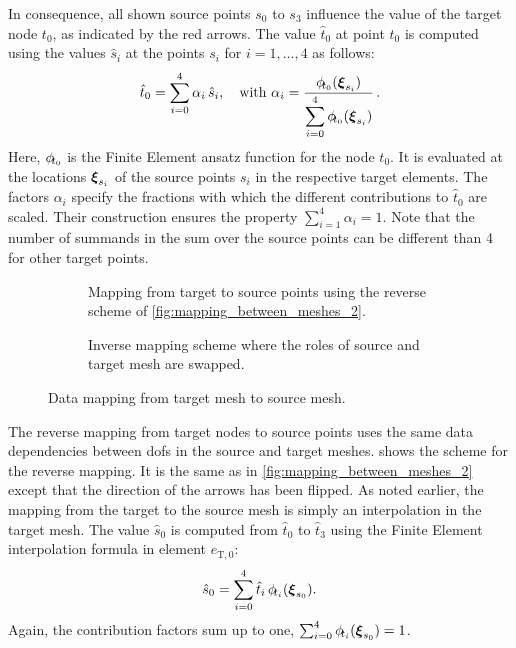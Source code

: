 In consequence, all shown source points $s_0$ to $s_3$ influence the value of the target node $t_0$, as indicated by the red arrows.
The value $\hat{t}_0$ at point $t_0$ is computed using the values $\hat{s}_i$ at the points $s_i$ for $i=1,\dots,4$ as follows:
%
\begin{align}\label{eq:mapping_source_target}
  \hat{t}_0 = \s{i=0}{4} \alpha_i\,\hat{s}_i, \quad \text{with }\alpha_i = \dfrac{\phi_{\noexpand\mkern-4mu t_0}(\bfxi_{s_i})}{\s{i=0}{4} \phi_{\noexpand\mkern-4mu t_0}(\bfxi_{s_i})}.
\end{align}
Here, $\phi_{\noexpand\mkern-4mu t_0}$ is the Finite Element ansatz function for the node $t_0$. It is evaluated at the locations $\boldsymbol{\xi}_{s_i}$ of the source points $s_i$ in the respective target elements. The factors $\alpha_i$ specify the fractions with which the different contributions to $\hat{t}_0$ are scaled. Their construction ensures the property $\sum_{i=1}^4 \alpha_i = 1$.
Note that the number of summands in the sum over the source points can be different than 4 for other target points.

\begin{figure}%
  \centering%
  \begin{subfigure}{0.4\textwidth}
    \centering
    \def\svgwidth{\textwidth}
    \caption{Mapping from target to source points using the reverse scheme of \cref{fig:mapping_between_meshes_2}.}%
    \label{fig:mapping_between_meshes_3}%
  \end{subfigure}
  \quad
  \begin{subfigure}{0.4\textwidth}
    \centering
    \def\svgwidth{\textwidth}
    \caption{Inverse mapping scheme where the roles of source and target mesh are swapped.}%
    \label{fig:mapping_between_meshes_4}%
  \end{subfigure}
  \caption{Data mapping from target mesh to source mesh.}%
  \label{fig:mapping_between_meshes_34}%
\end{figure}%

The reverse mapping from target nodes to source points uses the same data dependencies between dofs in the source and target meshes.  shows the scheme for the reverse mapping. It is the same as in \cref{fig:mapping_between_meshes_2} except that the direction of the arrows has been flipped. As noted earlier, the mapping from the target to the source mesh is simply an interpolation in the target mesh. The value $\hat{s}_0$ is computed from $\hat{t}_0$ to $\hat{t}_3$ using the Finite Element interpolation formula in element $e_{\text{T},0}$:%
\begin{align*}
  \hat{s}_0 = \s{i=0}{4}\hat{t}_i\,\phi_{\noexpand\mkern-4mu t_i}(\bfxi_{s_0}).
\end{align*}
Again, the contribution factors sum up to one, $\sum_{i=0}^4 \phi_{\noexpand\mkern-4mu t_i}(\bfxi_{s_0}) = 1$.

